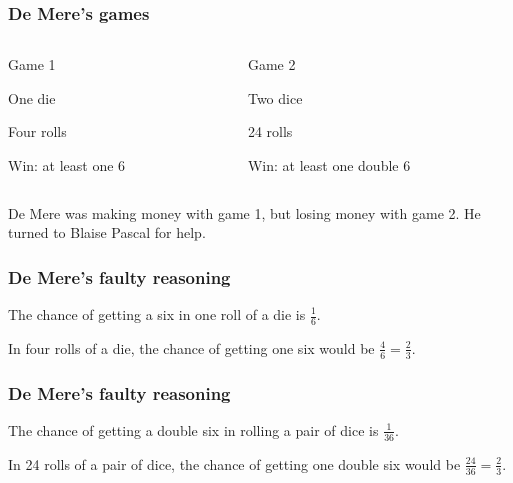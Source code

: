 \documentclass[12pt]{beamer}\usepackage[]{graphicx}\usepackage[]{color}
\begin{document}

\begin{frame}[fragile]
\frametitle{}
\begin{center}
\end{center}
\end{frame}


\begin{frame}[fragile]
\frametitle{De Mere's games}

\begin{columns}[t]
\begin{column}{0.4\textwidth}
Game 1
\bi
  \item One die
  \item Four rolls
  \item Win: at least one 6
\ei
\end{column}

\pause

\begin{column}{0.55\textwidth}
Game 2
\bi
  \item Two dice
  \item 24 rolls
  \item Win: at least one double 6
\ei
\end{column}
\end{columns}

\bigskip
\bigskip
\pause
De Mere was making money with game 1, but losing money with game 2. He turned to Blaise Pascal for help.
\end{frame}


\begin{frame}
\frametitle{De Mere's faulty reasoning}

\bbi
  \item The chance of getting a six in one roll of a die is $\frac{1}{6}$.
  \item In four rolls of a die, the chance of getting one six would be $\frac{4}{6}=\frac{2}{3}$.
\ei
\eb

\end{frame}


\begin{frame}
\frametitle{De Mere's faulty reasoning}

\bbi
  \item The chance of getting a double six in rolling a pair of dice is $\frac{1}{36}$.
  \item In 24 rolls of a pair of dice, the chance of getting one double six would be $\frac{24}{36}=\frac{2}{3}$.
\ei
\eb

\end{frame}
\end{document}
